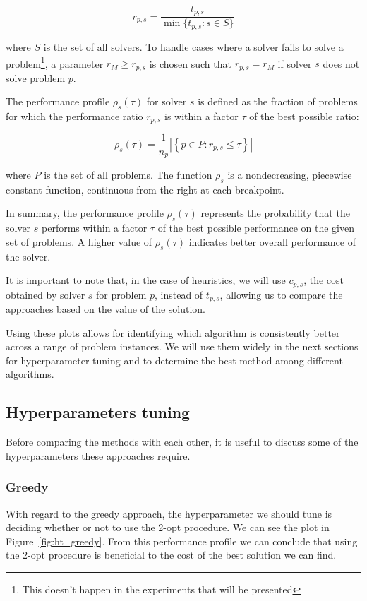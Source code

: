 \documentclass{article}
\begin{document}
\[
r_{p,s} = \frac{t_{p,s}}{\min\{t_{p,s} : s \in S\}}
\]

where \( S \) is the set of all solvers. To handle cases where a solver fails
to solve a problem\footnote{This doesn't happen in the experiments that will
be presented}, a parameter \( r_M \geq r_{p,s} \) is chosen such that \( r_{p,s}
= r_M \) if solver \( s \) does not solve problem \( p \).

The performance profile \( \rho_s(\tau) \) for solver \( s \) is defined as the fraction of problems for which the performance ratio \( r_{p,s} \) is within a factor \( \tau \) of the best possible ratio:

\[
\rho_s(\tau) = \frac{1}{n_p} \left| \left\{ p \in P : r_{p,s} \leq \tau \right\} \right|
\]

where \( P \) is the set of all problems. The function \( \rho_s \) is a nondecreasing, piecewise constant function, continuous from the right at each breakpoint.

In summary, the performance profile \( \rho_s(\tau) \) represents the probability that the solver \( s \) performs within a factor \( \tau \) of the best possible performance on the given set of problems. A higher value of \( \rho_s(\tau) \) indicates better overall performance of the solver.

It is important to note that, in the case of heuristics, we will use $c_{p,s}$,
the cost obtained by solver $s$ for problem $p$, instead of $t_{p,s}$, allowing
us to compare the approaches based on the value of the solution.

Using these plots allows for identifying which algorithm is consistently better across a range
of problem instances. We will use them widely in the next sections for hyperparameter tuning and
to determine the best method among different algorithms.


\subsection{Hyperparameters tuning}
Before comparing the methods with each other, it is useful to discuss some
of the hyperparameters these approaches require.

\subsubsection{Greedy}
With regard to the greedy approach, the hyperparameter we should tune is
deciding whether or not to use the 2-opt procedure. We can see the plot
in Figure~\ref{fig:ht_greedy}. From this performance profile we can conclude
that using the 2-opt procedure is beneficial to the cost of the best
solution we can find.
\end{document}

